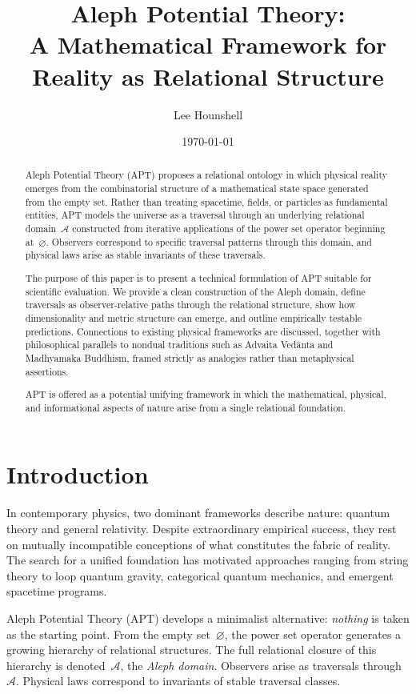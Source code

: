 \documentclass[12pt]{article}
\title{Aleph Potential Theory:\\
A Mathematical Framework for Reality as Relational Structure}
\author{Lee Hounshell}
\date{\today}
\begin{document}
\maketitle

\begin{abstract}
Aleph Potential Theory (APT) proposes a relational ontology in which
physical reality emerges from the combinatorial structure of a 
mathematical state space generated from the empty set. 
Rather than treating spacetime, fields, or particles as fundamental 
entities, APT models the universe as a traversal through an underlying 
relational domain~$\mathcal{A}$ constructed from iterative applications 
of the power set operator beginning at~$\varnothing$.
Observers correspond to specific traversal patterns through this domain, 
and physical laws arise as stable invariants of these traversals.

The purpose of this paper is to present a technical formulation of APT
suitable for scientific evaluation. 
We provide a clean construction of the Aleph domain, define traversals as
observer-relative paths through the relational structure, show how 
dimensionality and metric structure can emerge, and outline empirically 
testable predictions. 
Connections to existing physical frameworks are discussed, together with
philosophical parallels to nondual traditions such as Advaita Vedānta 
and Madhyamaka Buddhism, framed strictly as analogies rather than 
metaphysical assertions.

APT is offered as a potential unifying framework in which the
mathematical, physical, and informational aspects of nature arise from a
single relational foundation.
\end{abstract}

\tableofcontents

\section{Introduction}

In contemporary physics, two dominant frameworks describe nature:
quantum theory and general relativity.
Despite extraordinary empirical success, they rest on mutually
incompatible conceptions of what constitutes the fabric of reality.
The search for a unified foundation has motivated approaches ranging 
from string theory to loop quantum gravity, categorical quantum 
mechanics, and emergent spacetime programs.

Aleph Potential Theory (APT) develops a minimalist alternative:
\emph{nothing} is taken as the starting point.
From the empty set~$\varnothing$, the power set operator generates a 
growing hierarchy of relational structures.
The full relational closure of this hierarchy is denoted~$\mathcal{A}$,
the \emph{Aleph domain}.
Observers arise as traversals through~$\mathcal{A}$.
Physical laws correspond to invariants of stable traversal classes.
\end{document}
